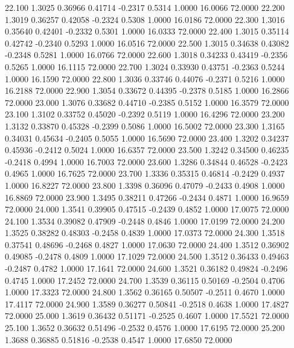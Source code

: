   22.100   1.3025   0.36966   0.41714  -0.2317   0.5314   1.0000  16.0066  72.0000
  22.200   1.3019   0.36257   0.42058  -0.2324   0.5308   1.0000  16.0186  72.0000
  22.300   1.3016   0.35640   0.42401  -0.2332   0.5301   1.0000  16.0333  72.0000
  22.400   1.3015   0.35114   0.42742  -0.2340   0.5293   1.0000  16.0516  72.0000
  22.500   1.3015   0.34638   0.43082  -0.2348   0.5281   1.0000  16.0766  72.0000
  22.600   1.3018   0.34233   0.43419  -0.2356   0.5265   1.0000  16.1115  72.0000
  22.700   1.3024   0.33930   0.43751  -0.2363   0.5244   1.0000  16.1590  72.0000
  22.800   1.3036   0.33746   0.44076  -0.2371   0.5216   1.0000  16.2188  72.0000
  22.900   1.3054   0.33672   0.44395  -0.2378   0.5185   1.0000  16.2866  72.0000
  23.000   1.3076   0.33682   0.44710  -0.2385   0.5152   1.0000  16.3579  72.0000
  23.100   1.3102   0.33752   0.45020  -0.2392   0.5119   1.0000  16.4296  72.0000
  23.200   1.3132   0.33870   0.45328  -0.2399   0.5086   1.0000  16.5002  72.0000
  23.300   1.3165   0.34031   0.45634  -0.2405   0.5055   1.0000  16.5690  72.0000
  23.400   1.3202   0.34237   0.45936  -0.2412   0.5024   1.0000  16.6357  72.0000
  23.500   1.3242   0.34500   0.46235  -0.2418   0.4994   1.0000  16.7003  72.0000
  23.600   1.3286   0.34844   0.46528  -0.2423   0.4965   1.0000  16.7625  72.0000
  23.700   1.3336   0.35315   0.46814  -0.2429   0.4937   1.0000  16.8227  72.0000
  23.800   1.3398   0.36096   0.47079  -0.2433   0.4908   1.0000  16.8869  72.0000
  23.900   1.3495   0.38211   0.47266  -0.2434   0.4871   1.0000  16.9659  72.0000
  24.000   1.3541   0.39905   0.47515  -0.2439   0.4852   1.0000  17.0075  72.0000
  24.100   1.3534   0.39082   0.47909  -0.2448   0.4846   1.0000  17.0199  72.0000
  24.200   1.3525   0.38282   0.48303  -0.2458   0.4839   1.0000  17.0373  72.0000
  24.300   1.3518   0.37541   0.48696  -0.2468   0.4827   1.0000  17.0630  72.0000
  24.400   1.3512   0.36902   0.49085  -0.2478   0.4809   1.0000  17.1029  72.0000
  24.500   1.3512   0.36433   0.49463  -0.2487   0.4782   1.0000  17.1641  72.0000
  24.600   1.3521   0.36182   0.49824  -0.2496   0.4745   1.0000  17.2452  72.0000
  24.700   1.3539   0.36115   0.50169  -0.2504   0.4706   1.0000  17.3323  72.0000
  24.800   1.3562   0.36165   0.50507  -0.2511   0.4670   1.0000  17.4117  72.0000
  24.900   1.3589   0.36277   0.50841  -0.2518   0.4638   1.0000  17.4827  72.0000
  25.000   1.3619   0.36432   0.51171  -0.2525   0.4607   1.0000  17.5521  72.0000
  25.100   1.3652   0.36632   0.51496  -0.2532   0.4576   1.0000  17.6195  72.0000
  25.200   1.3688   0.36885   0.51816  -0.2538   0.4547   1.0000  17.6850  72.0000

